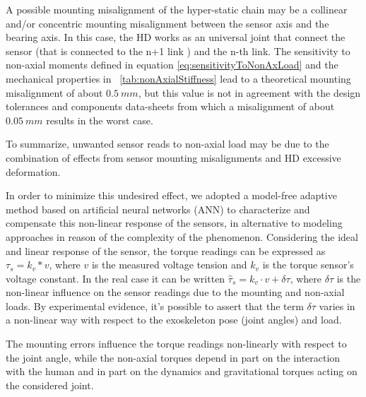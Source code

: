 %
%
\par A possible mounting misalignment of the hyper-static chain may be a collinear and/or concentric mounting misalignment between the sensor axis and the bearing axis. In this case, the HD works as an universal joint that connect the sensor (that is connected to the n+1 link ) and the n-th link. The sensitivity to non-axial moments defined in equation \eqref{eq:sensitivityToNonAxLoad} and  the mechanical properties  in \tablename \ \ref{tab:nonAxialStiffness} lead to a theoretical mounting misalignment of about $0.5 \ mm$, but this value is not in agreement with the design tolerances and components data-sheets from which a misalignment of about $0.05 \ mm$ results in the worst case.
%
\par To summarize, unwanted sensor reads to non-axial load may be due to the combination of effects from sensor mounting misalignments and HD excessive deformation. 
\par In order to minimize this undesired effect, we adopted a  model-free adaptive method based on artificial neural networks (ANN) to characterize and compensate this non-linear response of the sensors, in alternative to modeling approaches in reason of the complexity of the phenomenon. 
%
%
Considering the ideal and linear response of the sensor, the torque readings can be expressed as $\tau_s = k_v * v$, where $v$ is the measured voltage tension and $k_v$ is the torque sensor's voltage constant. In the real case it can be written $\hat{\tau}_s = k_v \cdot v + \delta\tau$, where $\delta\tau$ is the non-linear influence on the sensor readings due to the mounting and non-axial loads.
By experimental evidence, it's possible to assert that the term $\delta\tau$ varies in a non-linear way with respect to the exoskeleton pose (joint angles) and load.
\par The mounting errors influence the torque readings non-linearly with respect to the joint angle, while the non-axial torques depend in part on the interaction with the human and in part on the dynamics and gravitational torques acting on the considered joint.

